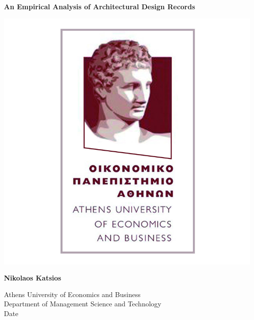 \begin{titlepage}
    \begin{center}
        \vspace*{1cm}
            
        \Huge
        \textbf{An Empirical Analysis of Architectural Design Records}
            
        \vspace{0.5cm}

        \includegraphics[scale=0.5]{figures/athens_university_logo.png}
            
        \vspace{1.5cm}
            
        \textbf{Nikolaos Katsios}
            
        \vspace{0.8cm}
        
        \Large
        Athens University of Economics and Business \\
        Department of Management Science and Technology\\
        Date\\
    \end{center}
\end{titlepage}